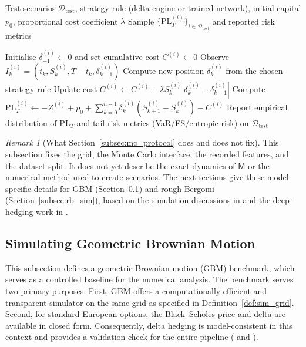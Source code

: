 \documentclass[12pt,a4paper]{article}
\theoremstyle{definition}
\theoremstyle{plain}
\theoremstyle{remark}
\newtheorem{remark}{Remark}[section]
\theoremstyle{plain}
\begin{document}
\begin{algorithm}[H]
\caption{Out-of-sample hedging evaluation on a fixed test set}
\label{alg:hedging_evaluation}
\begin{algorithmic}[1]
\Require Test scenarios $\mathcal{D}_{\mathrm{test}}$, strategy rule (delta engine or trained network), initial capital $p_0$, proportional cost coefficient $\lambda$
\Ensure Sample $\{\mathrm{PL}_T^{(i)}\}_{i\in\mathcal{D}_{\mathrm{test}}}$ and reported risk metrics

    \State Initialise $\delta_{-1}^{(i)}\gets 0$ and set cumulative cost $C^{(i)}\gets 0$
        \State Observe $I_k^{(i)}=(t_k,S_k^{(i)},T-t_k,\delta_{k-1}^{(i)})$
        \State Compute new position $\delta_k^{(i)}$ from the chosen strategy rule
        \State Update cost $C^{(i)}\gets C^{(i)}+\lambda S_k^{(i)}|\delta_k^{(i)}-\delta_{k-1}^{(i)}|$
    \EndFor
    \State Compute $\mathrm{PL}_T^{(i)}\gets -Z^{(i)}+p_0+\sum_{k=0}^{n-1}\delta_k^{(i)}(S_{k+1}^{(i)}-S_k^{(i)})-C^{(i)}$
\EndFor
\State Report empirical distribution of $\mathrm{PL}_T$ and tail-risk metrics (VaR/ES/entropic risk) on $\mathcal{D}_{\mathrm{test}}$
\end{algorithmic}
\end{algorithm}

\begin{remark}[What Section~\ref{subsec:mc_protocol} does and does not fix]
\label{rem:protocol_scope}
This subsection fixes the grid, the Monte Carlo interface, the recorded features, and the dataset split. 
It does not yet describe the exact dynamics of $\mathsf{M}$ or the numerical method used to create scenarios.
The next sections give these model-specific details for GBM (Section~\ref{subsec:gbm_sim}) and rough Bergomi (Section~\ref{subsec:rb_sim}), based on the simulation discussions in \cite{BayerFriz2016} and the deep-hedging work in \cite{Horvath2021DeepRough}.
\end{remark}
\newpage

\subsection{Simulating Geometric Brownian Motion}
\label{subsec:gbm_sim}

This subsection defines a geometric Brownian motion (GBM) benchmark, which serves as a controlled baseline for the numerical analysis.
The benchmark serves two primary purposes. First, GBM offers a computationally efficient and transparent simulator on the same grid as specified in Definition~\ref{def:sim_grid}.
Second, for standard European options, the Black--Scholes price and delta are available in closed form. Consequently, delta hedging is model-consistent in this context and provides a validation check for the entire pipeline (\cite{BlackScholes1973} and \cite{Buehler2019DeepHedging}).
\end{document}
